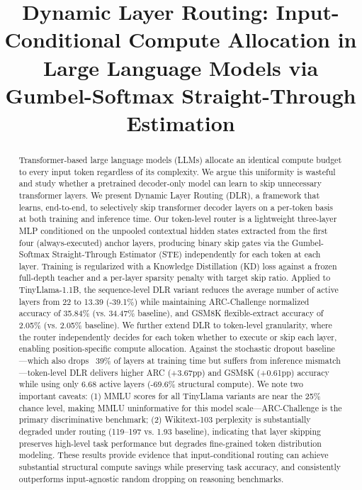 \documentclass[conference]{IEEEtran}
\begin{document}
\title{Dynamic Layer Routing: Input-Conditional Compute Allocation in Large Language Models via Gumbel-Softmax Straight-Through Estimation}

\author{
}

\maketitle

\begin{abstract}
Transformer-based large language models (LLMs) allocate an identical compute budget to every input token regardless of its complexity. We argue this uniformity is wasteful and study whether a pretrained decoder-only model can learn to skip unnecessary transformer layers. We present Dynamic Layer Routing (DLR), a framework that learns, end-to-end, to selectively skip transformer decoder layers on a per-token basis at both training and inference time. Our token-level router is a lightweight three-layer MLP conditioned on the unpooled contextual hidden states extracted from the first four (always-executed) anchor layers, producing binary skip gates via the Gumbel-Softmax Straight-Through Estimator (STE) independently for each token at each layer. Training is regularized with a Knowledge Distillation (KD) loss against a frozen full-depth teacher and a per-layer sparsity penalty with target skip ratio. Applied to TinyLlama-1.1B, the sequence-level DLR variant reduces the average number of active layers from 22 to 13.39 (-39.1\%) while maintaining ARC-Challenge normalized accuracy of 35.84\% (vs. 34.47\% baseline), and GSM8K flexible-extract accuracy of 2.05\% (vs. 2.05\% baseline). We further extend DLR to token-level granularity, where the router independently decides for each token whether to execute or skip each layer, enabling position-specific compute allocation. Against the stochastic dropout baseline---which also drops ~39\% of layers at training time but suffers from inference mismatch---token-level DLR delivers higher ARC (+3.67pp) and GSM8K (+0.61pp) accuracy while using only 6.68 active layers (-69.6\% structural compute). We note two important caveats: (1) MMLU scores for all TinyLlama variants are near the 25\% chance level, making MMLU uninformative for this model scale---ARC-Challenge is the primary discriminative benchmark; (2) Wikitext-103 perplexity is substantially degraded under routing (119--197 vs. 1.93 baseline), indicating that layer skipping preserves high-level task performance but degrades fine-grained token distribution modeling. These results provide evidence that input-conditional routing can achieve substantial structural compute savings while preserving task accuracy, and consistently outperforms input-agnostic random dropping on reasoning benchmarks.
\end{abstract}
\end{document}
